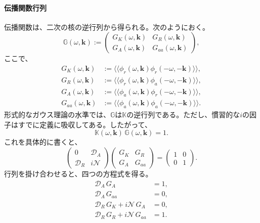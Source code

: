 \documentclass[a4paper,11pt,oneside]{article}
\theoremstyle{definition}
\numberwithin{equation}{section}
\begin{document}
\paragraph{伝播関数行列}



伝播関数は、二次の核の逆行列から得られる。次のようにおく。
\begin{equation}
\mathbb G(\omega,\mathbf k)
:=
\begin{pmatrix}
G_K(\omega,\mathbf k) & G_R(\omega,\mathbf k) \\[2mm]
G_A(\omega,\mathbf k) & G_{aa}(\omega,\mathbf k)
\end{pmatrix} ,
\end{equation}
ここで、
\begin{align}
G_K(\omega,\mathbf k)
&:=
\langle\!\langle \phi_r(\omega,\mathbf k)\phi_r(-\omega,-\mathbf k)\rangle\!\rangle ,
\\
G_R(\omega,\mathbf k)
&:=
\langle\!\langle \phi_r(\omega,\mathbf k)\phi_a(-\omega,-\mathbf k)\rangle\!\rangle ,
\\
G_A(\omega,\mathbf k)
&:=
\langle\!\langle \phi_a(\omega,\mathbf k)\phi_r(-\omega,-\mathbf k)\rangle\!\rangle ,
\\
G_{aa}(\omega,\mathbf k)
&:=
\langle\!\langle \phi_a(\omega,\mathbf k)\phi_a(-\omega,-\mathbf k)\rangle\!\rangle .
\end{align}
形式的なガウス理論の水準では、\(\mathbb G\)は\(\mathbb K\)の逆行列である。ただし、慣習的な\(i\)の因子はすでに定義に吸収してある。したがって、
\begin{equation}
\mathbb K(\omega,\mathbf k)\,\mathbb G(\omega,\mathbf k)=1 .
\end{equation}
これを具体的に書くと、
\begin{equation}
\begin{pmatrix}
0 & \mathcal D_A \\[1mm]
\mathcal D_R & i\mathcal N
\end{pmatrix}
\begin{pmatrix}
G_K & G_R \\[1mm]
G_A & G_{aa}
\end{pmatrix}
=
\begin{pmatrix}
1 & 0 \\[1mm]
0 & 1
\end{pmatrix} .
\end{equation}
行列を掛け合わせると、四つの方程式を得る。
\begin{align}
\mathcal D_A\,G_A &= 1 ,
\\
\mathcal D_A\,G_{aa} &= 0 ,
\\
\mathcal D_R\,G_K + i\mathcal N\,G_A &= 0 ,
\\
\mathcal D_R\,G_R + i\mathcal N\,G_{aa} &= 1 .
\end{align}
\end{document}
